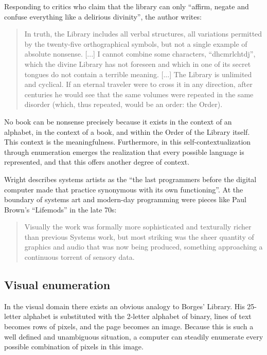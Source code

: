 \documentclass{thesis}
\begin{document}
	Responding to critics who claim that the library can only ``affirm, negate and confuse everything like a delirious divinity'', the author writes:
	
	\begin{quote}
	In truth, the Library includes all verbal structures, all variations permitted by the twenty-five orthographical symbols, but not a single example of absolute nonsense. [...] I cannot combine some characters, ``dhcmrlchtdj'', which the divine Library has not foreseen and which in one of its secret tongues do not contain a terrible meaning. [...] The Library is unlimited and cyclical. If an eternal traveler were to cross it in any direction, after centuries he would see that the same volumes were repeated in the same disorder (which, thus repeated, would be an order: the Order).
	\end{quote}
	
	No book can be nonsense precisely because it exists in the context of an alphabet, in the context of a book, and within the Order of the Library itself. This context is the meaningfulness. Furthermore, in this self-contextualization through enumeration emerges the realization that every possible language is represented, and that this offers another degree of context.
	
	Wright\cite{Wright09} describes systems artists as the ``the last programmers before the digital computer made that practice synonymous with its own functioning''. At the boundary of systems art and modern-day programming were pieces like Paul Brown's ``Lifemods'' in the late 70s:
	
	\begin{quote}
	Visually the work was formally more sophisticated and texturally richer than previous Systems work, but most striking was the sheer quantity of graphics and audio that was now being produced, something approaching a continuous torrent of sensory data.
	\end{quote}
	
\subsection{Visual enumeration}
	In the visual domain there exists an obvious analogy to Borges' Library. His 25-letter alphabet is substituted with the 2-letter alphabet of binary, lines of text becomes rows of pixels, and the page becomes an image. Because this is such a well defined and unambiguous situation, a computer can steadily enumerate every possible combination of pixels in this image.
	
\end{document}

